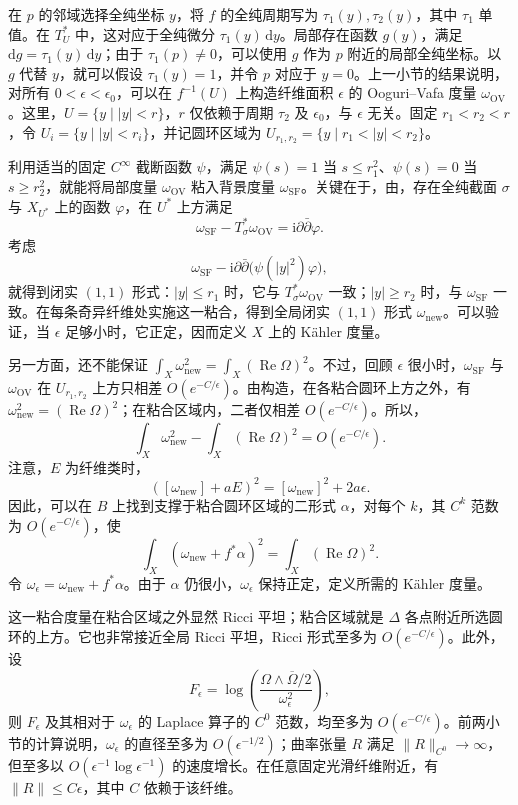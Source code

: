 在 $p$ 的邻域选择全纯坐标 $y$，将 $f$ 的全纯周期写为 $\tau_1(y),\tau_2(y)$，其中 $\tau_1$ 单值。在 $T^*_U$ 中，这对应于全纯微分 $\tau_1(y)\,\mathrm dy$。局部存在函数 $g(y)$，满足 $\mathrm dg=\tau_1(y)\,\mathrm dy$；由于 $\tau_1(p)\neq0$，可以使用 $g$ 作为 $p$ 附近的局部全纯坐标。以 $g$ 代替 $y$，就可以假设 $\tau_1(y)=1$，并令 $p$ 对应于 $y=0$。上一小节的结果说明，对所有 $0<\epsilon<\epsilon_0$，可以在 $f^{-1}(U)$ 上构造纤维面积 $\epsilon$ 的 Ooguri--Vafa 度量 $\omega_{\mathrm{OV}}$。这里，$U=\{y\mid|y|<r\}$，$r$ 仅依赖于周期 $\tau_2$ 及 $\epsilon_0$，与 $\epsilon$ 无关。固定 $r_1<r_2<r$，令 $U_i=\{y\mid|y|<r_i\}$，并记圆环区域为 $U_{r_1,r_2}=\{y\mid r_1<|y|<r_2\}$。

利用适当的固定 $C^\infty$ 截断函数 $\psi$，满足 $\psi(s)=1$ 当 $s\leq r_1^2$、$\psi(s)=0$ 当 $s\geq r_2^2$，就能将局部度量 $\omega_{\mathrm{OV}}$ 粘入背景度量 $\omega_{\mathrm{SF}}$。关键在于，由，存在全纯截面 $\sigma$ 与 $X_{U^*}$ 上的函数 $\varphi$，在 $U^*$ 上方满足
\[
\omega_{\mathrm{SF}}-T_\sigma^*\omega_{\mathrm{OV}}
=\mathrm i\partial\bar\partial\varphi.
\]
考虑
\[
\omega_{\mathrm{SF}}
-\mathrm i\partial\bar\partial\bigl(\psi(|y|^2)\varphi\bigr),
\]
就得到闭实 $(1,1)$ 形式：$|y|\leq r_1$ 时，它与 $T_\sigma^*\omega_{\mathrm{OV}}$ 一致；$|y|\geq r_2$ 时，与 $\omega_{\mathrm{SF}}$ 一致。在每条奇异纤维处实施这一粘合，得到全局闭实 $(1,1)$ 形式 $\omega_{\mathrm{new}}$。可以验证，当 $\epsilon$ 足够小时，它正定，因而定义 $X$ 上的 Kähler 度量。

另一方面，还不能保证 $\int_X\omega_{\mathrm{new}}^2=\int_X(\operatorname{Re}\Omega)^2$。不过，回顾 $\epsilon$ 很小时，$\omega_{\mathrm{SF}}$ 与 $\omega_{\mathrm{OV}}$ 在 $U_{r_1,r_2}$ 上方只相差 $O(e^{-C/\epsilon})$。由构造，在各粘合圆环上方之外，有 $\omega_{\mathrm{new}}^2=(\operatorname{Re}\Omega)^2$；在粘合区域内，二者仅相差 $O(e^{-C/\epsilon})$。所以，
\[
\int_X\omega_{\mathrm{new}}^2-\int_X(\operatorname{Re}\Omega)^2
=O(e^{-C/\epsilon}).
\]
注意，$E$ 为纤维类时，
\[
([\omega_{\mathrm{new}}]+aE)^2
=[\omega_{\mathrm{new}}]^2+2a\epsilon.
\]
因此，可以在 $B$ 上找到支撑于粘合圆环区域的二形式 $\alpha$，对每个 $k$，其 $C^k$ 范数为 $O(e^{-C/\epsilon})$，使
\[
\int_X(\omega_{\mathrm{new}}+f^*\alpha)^2
=\int_X(\operatorname{Re}\Omega)^2.
\]
令 $\omega_\epsilon=\omega_{\mathrm{new}}+f^*\alpha$。由于 $\alpha$ 仍很小，$\omega_\epsilon$ 保持正定，定义所需的 Kähler 度量。

这一粘合度量在粘合区域之外显然 Ricci 平坦；粘合区域就是 $\Delta$ 各点附近所选圆环的上方。它也非常接近全局 Ricci 平坦，Ricci 形式至多为 $O(e^{-C/\epsilon})$。此外，设
\[
F_\epsilon=\log\left(\frac{\Omega\wedge\overline\Omega/2}{\omega_\epsilon^2}\right),
\]
则 $F_\epsilon$ 及其相对于 $\omega_\epsilon$ 的 Laplace 算子的 $C^0$ 范数，均至多为 $O(e^{-C/\epsilon})$。前两小节的计算说明，$\omega_\epsilon$ 的直径至多为 $O(\epsilon^{-1/2})$；曲率张量 $R$ 满足 $\|R\|_{C^0}\to\infty$，但至多以 $O(\epsilon^{-1}\log\epsilon^{-1})$ 的速度增长。在任意固定光滑纤维附近，有 $\|R\|\leq C\epsilon$，其中 $C$ 依赖于该纤维。

